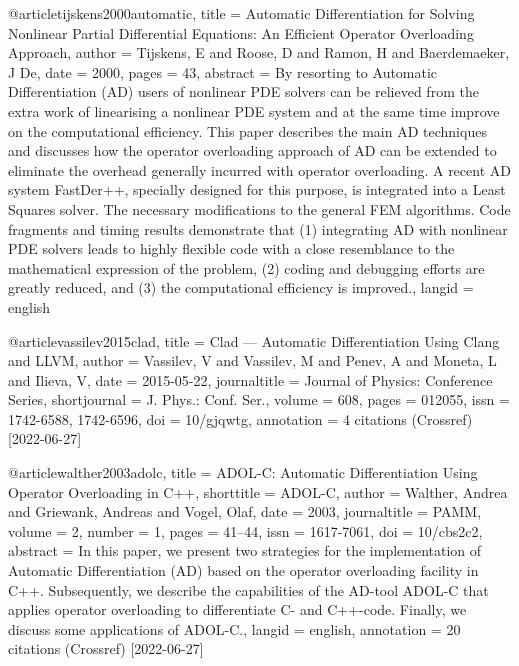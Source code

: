 @article{tijskens2000automatic,
  title = {Automatic {{Differentiation}} for {{Solving Nonlinear Partial Differential Equations}}: {{An Efficient Operator Overloading Approach}}},
  author = {Tijskens, E and Roose, D and Ramon, H and Baerdemaeker, J De},
  date = {2000},
  pages = {43},
  abstract = {By resorting to Automatic Differentiation (AD) users of nonlinear PDE solvers can be relieved from the extra work of linearising a nonlinear PDE system and at the same time improve on the computational efficiency. This paper describes the main AD techniques and discusses how the operator overloading approach of AD can be extended to eliminate the overhead generally incurred with operator overloading. A recent AD system FastDer++, specially designed for this purpose, is integrated into a Least Squares solver. The necessary modifications to the general FEM algorithms. Code fragments and timing results demonstrate that (1) integrating AD with nonlinear PDE solvers leads to highly flexible code with a close resemblance to the mathematical expression of the problem, (2) coding and debugging efforts are greatly reduced, and (3) the computational efficiency is improved.},
  langid = {english}
}

@article{vassilev2015clad,
  title = {Clad — {{Automatic Differentiation Using Clang}} and {{LLVM}}},
  author = {Vassilev, V and Vassilev, M and Penev, A and Moneta, L and Ilieva, V},
  date = {2015-05-22},
  journaltitle = {Journal of Physics: Conference Series},
  shortjournal = {J. Phys.: Conf. Ser.},
  volume = {608},
  pages = {012055},
  issn = {1742-6588, 1742-6596},
  doi = {10/gjqwtg},
  annotation = {4 citations (Crossref) [2022-06-27]}
}

@article{walther2003adolc,
  title = {{{ADOL-C}}: {{Automatic Differentiation Using Operator Overloading}} in {{C}}++},
  shorttitle = {{{ADOL-C}}},
  author = {Walther, Andrea and Griewank, Andreas and Vogel, Olaf},
  date = {2003},
  journaltitle = {PAMM},
  volume = {2},
  number = {1},
  pages = {41--44},
  issn = {1617-7061},
  doi = {10/cbs2c2},
  abstract = {In this paper, we present two strategies for the implementation of Automatic Differentiation (AD) based on the operator overloading facility in C++. Subsequently, we describe the capabilities of the AD-tool ADOL-C that applies operator overloading to differentiate C- and C++-code. Finally, we discuss some applications of ADOL-C.},
  langid = {english},
  annotation = {20 citations (Crossref) [2022-06-27]}
}

